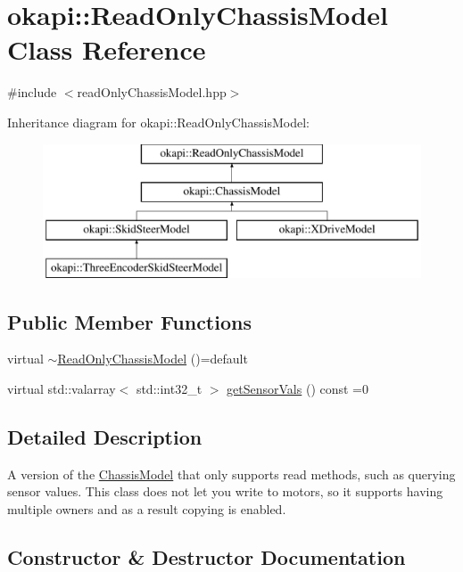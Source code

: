 \hypertarget{classokapi_1_1ReadOnlyChassisModel}{}\section{okapi\+::Read\+Only\+Chassis\+Model Class Reference}
\label{classokapi_1_1ReadOnlyChassisModel}


{\ttfamily \#include $<$read\+Only\+Chassis\+Model.\+hpp$>$}

Inheritance diagram for okapi\+::Read\+Only\+Chassis\+Model\+:\begin{figure}[H]
\begin{center}
\leavevmode
\includegraphics[height=4.000000cm]{classokapi_1_1ReadOnlyChassisModel}
\end{center}
\end{figure}
\subsection*{Public Member Functions}
\begin{DoxyCompactItemize}
\item 
virtual \mbox{\hyperlink{classokapi_1_1ReadOnlyChassisModel_a1994ed80cbfdc34f30f90083d4c8620d}{$\sim$\+Read\+Only\+Chassis\+Model}} ()=default
\item 
virtual std\+::valarray$<$ std\+::int32\+\_\+t $>$ \mbox{\hyperlink{classokapi_1_1ReadOnlyChassisModel_af2d844d9e12bb7c778ac9a5a0074f848}{get\+Sensor\+Vals}} () const =0
\end{DoxyCompactItemize}


\subsection{Detailed Description}
A version of the \mbox{\hyperlink{classokapi_1_1ChassisModel}{Chassis\+Model}} that only supports read methods, such as querying sensor values. This class does not let you write to motors, so it supports having multiple owners and as a result copying is enabled. 

\subsection{Constructor \& Destructor Documentation}
\mbox{\label{classokapi_1_1ReadOnlyChassisModel_a1994ed80cbfdc34f30f90083d4c8620d}} 
